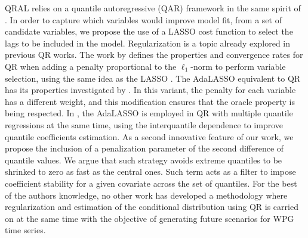 QRAL relies on a quantile autoregressive (QAR) framework in the same spirit of \cite{koenker1978regression,koenker_quantile_2006,koenker2005quantile}. In order to capture which variables would improve model fit, from a set of candidate variables, we propose the use of a LASSO cost function to select the lags to be included in the model.
Regularization is a topic already explored in previous QR works.
The work by \cite{belloni_l1-penalized_2009} defines the properties and convergence rates for QR when adding a penalty proportional to the $\ell_1$-norm to perform variable selection, using the same idea as the LASSO \cite{tibshirani1996regression}. The AdaLASSO equivalent to QR has its properties investigated by \cite{ciuperca_adaptive_2016}. In this variant, the penalty for each variable has a different weight, and this modification ensures that the oracle property is being respected. %
In \cite{zou_regularized_2008,jiang_interquantile_2014}, the AdaLASSO is employed in QR with multiple quantile regressions at the same time, using the interquantile dependence to improve  quantile coefficients estimation.
As a second innovative feature of our work, we propose the inclusion of a penalization parameter of the second difference of quantile values. We argue that such strategy avoids extreme quantiles to be shrinked to zero as fast as the central ones. Such term acts as a filter to impose coefficient stability for a given covariate across the set of quantiles.
For the best of the authors knowledge, no other work has developed a methodology where regularization and estimation of the conditional distribution using QR is carried on at the same time with the objective of generating future scenarios for WPG time series.









